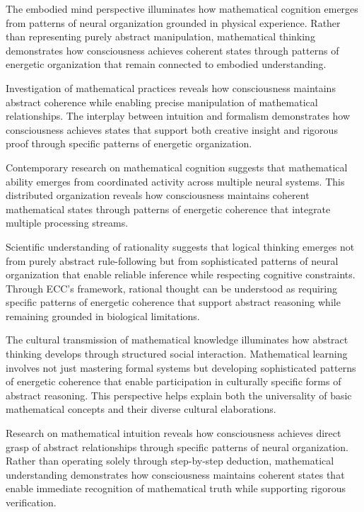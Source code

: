 The embodied mind perspective \cite{Varela1991} illuminates how mathematical cognition emerges from patterns of neural organization grounded in physical experience. Rather than representing purely abstract manipulation, mathematical thinking demonstrates how consciousness achieves coherent states through patterns of energetic organization that remain connected to embodied understanding.

Investigation of mathematical practices \cite{Rotman1993} reveals how consciousness maintains abstract coherence while enabling precise manipulation of mathematical relationships. The interplay between intuition and formalism demonstrates how consciousness achieves states that support both creative insight and rigorous proof through specific patterns of energetic organization.

Contemporary research on mathematical cognition \cite{DAmbrosio1985} suggests that mathematical ability emerges from coordinated activity across multiple neural systems. This distributed organization reveals how consciousness maintains coherent mathematical states through patterns of energetic coherence that integrate multiple processing streams.

Scientific understanding of rationality \cite{Gigerenzer2008} suggests that logical thinking emerges not from purely abstract rule-following but from sophisticated patterns of neural organization that enable reliable inference while respecting cognitive constraints. Through ECC's framework, rational thought can be understood as requiring specific patterns of energetic coherence that support abstract reasoning while remaining grounded in biological limitations.

The cultural transmission of mathematical knowledge \cite{Sperber1996} illuminates how abstract thinking develops through structured social interaction. Mathematical learning involves not just mastering formal systems but developing sophisticated patterns of energetic coherence that enable participation in culturally specific forms of abstract reasoning. This perspective helps explain both the universality of basic mathematical concepts and their diverse cultural elaborations.

Research on mathematical intuition \cite{Barrow1992} reveals how consciousness achieves direct grasp of abstract relationships through specific patterns of neural organization. Rather than operating solely through step-by-step deduction, mathematical understanding demonstrates how consciousness maintains coherent states that enable immediate recognition of mathematical truth while supporting rigorous verification.

